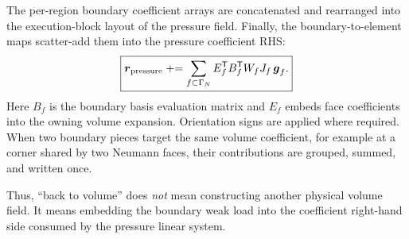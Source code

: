 The per-region boundary coefficient arrays are concatenated and rearranged
into the execution-block layout of the pressure field.  Finally, the
boundary-to-element maps scatter-add them into the pressure coefficient RHS:
\begin{equation}
  \boxed{
  \boldsymbol{r}_{\mathrm{pressure}}
  \mathrel{+}=
  \sum_{f\subset\Gamma_N}
  E_f^{\mathsf T}B_f^{\mathsf T}W_fJ_f\,\boldsymbol{g}_f.}
  \label{hopbc:eq:weak-scatter}
\end{equation}
Here \(B_f\) is the boundary basis evaluation matrix and \(E_f\) embeds face
coefficients into the owning volume expansion.  Orientation signs are applied
where required.  When two boundary pieces target the same volume coefficient,
for example at a corner shared by two Neumann faces, their contributions are
grouped, summed, and written once.

Thus, ``back to volume'' does \emph{not} mean constructing another physical
volume field.  It means embedding the boundary weak load into the coefficient
right-hand side consumed by the pressure linear system.

